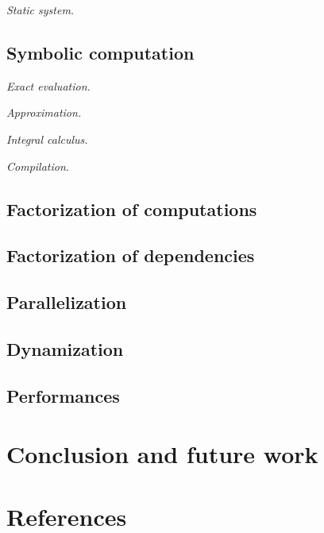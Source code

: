\documentclass[twocolumn,twoside]{Jornadas}
\begin{document}
\textit{Static system.}

\subsection{Symbolic computation}

\textit{Exact evaluation.}

\textit{Approximation.}

\textit{Integral calculus.}

\textit{Compilation.}

\subsection{Factorization of computations}

\subsection{Factorization of dependencies}

\subsection{Parallelization}

\subsection{Dynamization}

\subsection{Performances}

\section{Conclusion and future work}

\section*{References}


%
\end{document}
